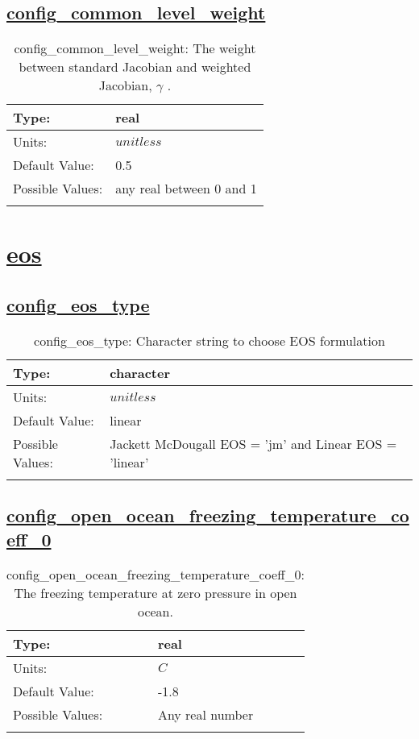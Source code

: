 \subsection[config\_common\_level\_weight]{\hyperref[sec:nm_tab_pressure_gradient]{config\_common\_level\_weight}}
\label{subsec:nm_sec_config_common_level_weight}
\begin{center}
\begin{longtable}{| p{2.0in} || p{4.0in} |}
    \hline
    Type: & real \\
    \hline
    Units: & $unitless$ \\
    \hline
    Default Value: & 0.5 \\
    \hline
    Possible Values: & any real between 0 and 1 \\
    \hline
    \caption{config\_common\_level\_weight:  The weight between standard Jacobian and weighted Jacobian,  $\gamma$ .}
\end{longtable}
\end{center}
\section[eos]{\hyperref[sec:nm_tab_eos]{eos}}
\label{sec:nm_sec_eos}
\subsection[config\_eos\_type]{\hyperref[sec:nm_tab_eos]{config\_eos\_type}}
\label{subsec:nm_sec_config_eos_type}
\begin{center}
\begin{longtable}{| p{2.0in} || p{4.0in} |}
    \hline
    Type: & character \\
    \hline
    Units: & $unitless$ \\
    \hline
    Default Value: & linear \\
    \hline
    Possible Values: & Jackett McDougall EOS = 'jm' and Linear EOS = 'linear' \\
    \hline
    \caption{config\_eos\_type: Character string to choose EOS formulation}
\end{longtable}
\end{center}
\subsection[config\_open\_ocean\_freezing\_temperature\_coeff\_0]{\hyperref[sec:nm_tab_eos]{config\_open\_ocean\_freezing\_temperature\_coeff\_0}}
\label{subsec:nm_sec_config_open_ocean_freezing_temperature_coeff_0}
\begin{center}
\begin{longtable}{| p{2.0in} || p{4.0in} |}
    \hline
    Type: & real \\
    \hline
    Units: & $C$ \\
    \hline
    Default Value: & -1.8 \\
    \hline
    Possible Values: & Any real number \\
    \hline
    \caption{config\_open\_ocean\_freezing\_temperature\_coeff\_0: The freezing temperature at zero pressure in open ocean.}
\end{longtable}
\end{center}
